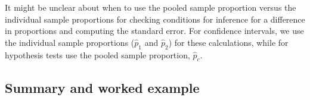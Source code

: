 It might be unclear about when to use the pooled sample proportion versus the individual sample proportions for checking conditions for inference for a difference in proportions and computing the standard error. For confidence intervals, we use the individual sample proportions ($\hat{p}_1$ and $\hat{p}_2$) for these calculations, while for hypothesis tests use the pooled sample proportion, $\hat{p}_c$.

%

\newpage
 
 \subsection[Summary and worked example]{Summary and worked example}


